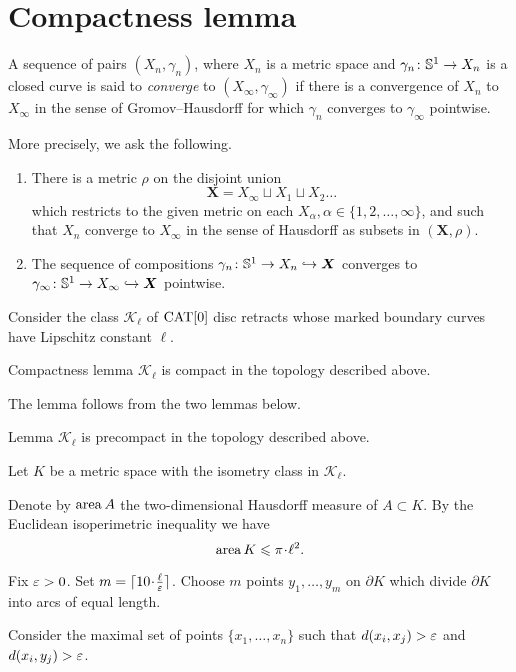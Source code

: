 \section{Compactness lemma}\label{Compactness}

A sequence of pairs $(X_n,\gamma_n)$, where $X_n$ is a metric space and $\gamma_n\colon\mathbb{S}^1\to X_n$ is a 
closed curve is said to \emph{converge} to $(X_\infty,\gamma_\infty)$ if there is a convergence of $X_n$ to $X_\infty$ 
in the sense of Gromov--Hausdorff for which $\gamma_n$ converges to $\gamma_\infty$ pointwise.

More precisely, we ask the following.
\begin{enumerate}[(1)]
	\item There is a metric $\rho$ on the disjoint union 
\[\bm{X}=X_\infty\sqcup X_1\sqcup X_2\dots\]
which restricts to the given metric on each $X_\alpha, \alpha\in\{1,2,\dots,\infty\}$, 
and such that $X_n$ converge to $X_\infty$ in the sense of Hausdorff as subsets in $(\bm{X},\rho)$.
\item  The sequence of compositions $\gamma_n\colon\mathbb{S}^1\to X_n \hookrightarrow\bm{X}$ 
converges to $\gamma_\infty\:\SS^1\zz\to X_\infty \hookrightarrow\bm{X}$ pointwise.
\end{enumerate}
Consider the class $\mathcal{K}_\ell$ of $\mathop{\rm CAT}\nolimits[0]$ disc retracts whose marked
boundary curves have Lipschitz constant $\ell$.


\begin{thm}{Compactness lemma}\label{lem:compact}
$\mathcal{K}_\ell$ is compact in the topology described above.
\end{thm}

The lemma follows from the two lemmas below.

\begin{thm}{Lemma}\label{lem:precompact}
$\mathcal{K}_\ell$ is precompact in the topology described above.
\end{thm}

Let $K$ be a metric space with the isometry class in $\mathcal {K}_\ell$.

Denote by $\mathop{\rm area}\nolimits A$ the two-dimensional Hausdorff measure of $A\subset K$.
By the Euclidean isoperimetric inequality we have 
\[\area K \le \pi\cdot\ell^2.\]

Fix $\varepsilon>0$. 
Set $m=\lceil 10\cdot\tfrac\ell\eps\rceil$.
Choose $m$ points $y_1,\dots,y_m$ on $\partial K$
which divide $\partial K$ into arcs of equal length.

Consider the maximal set of points $\{x_1,\dots,x_n\}$ such that $d(x_i,x_j)>\varepsilon$ and $d(x_i,y_j)>\varepsilon$.

